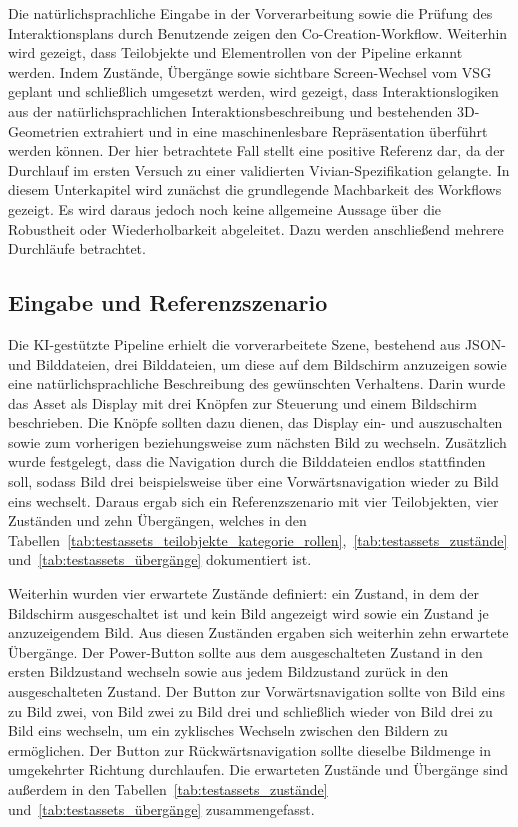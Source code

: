 

Die natürlichsprachliche Eingabe in der Vorverarbeitung sowie die Prüfung des Interaktionsplans durch Benutzende zeigen den Co-Creation-Workflow. Weiterhin wird gezeigt, dass Teilobjekte und Elementrollen von der Pipeline erkannt werden. Indem Zustände, Übergänge sowie sichtbare Screen-Wechsel vom VSG geplant und schließlich umgesetzt werden, wird gezeigt, dass Interaktionslogiken aus der natürlichsprachlichen Interaktionsbeschreibung und bestehenden 3D-Geometrien extrahiert und in eine maschinenlesbare Repräsentation überführt werden können. Der hier betrachtete Fall stellt eine positive Referenz dar, da der Durchlauf im ersten Versuch zu einer validierten Vivian-Spezifikation gelangte. In diesem Unterkapitel wird zunächst die grundlegende Machbarkeit des Workflows gezeigt. Es wird daraus jedoch noch keine allgemeine Aussage über die Robustheit oder Wiederholbarkeit abgeleitet. Dazu werden anschließend mehrere Durchläufe betrachtet.

\subsection{Eingabe und Referenzszenario}

Die KI-gestützte Pipeline erhielt die vorverarbeitete Szene, bestehend aus JSON- und Bilddateien, drei Bilddateien, um diese auf dem Bildschirm anzuzeigen sowie eine natürlichsprachliche Beschreibung des gewünschten Verhaltens. Darin wurde das Asset als Display mit drei Knöpfen zur Steuerung und einem Bildschirm beschrieben. Die Knöpfe sollten dazu dienen, das Display ein- und auszuschalten sowie zum vorherigen beziehungsweise zum nächsten Bild zu wechseln. Zusätzlich wurde festgelegt, dass die Navigation durch die Bilddateien endlos stattfinden soll, sodass Bild drei beispielsweise über eine Vorwärtsnavigation wieder zu Bild eins wechselt. Daraus ergab sich ein Referenzszenario mit vier Teilobjekten, vier Zuständen und zehn Übergängen, welches in den Tabellen~\ref{tab:testassets_teilobjekte_kategorie_rollen},~\ref{tab:testassets_zustände} und~\ref{tab:testassets_übergänge} dokumentiert ist.

Weiterhin wurden vier erwartete Zustände definiert: ein Zustand, in dem der Bildschirm ausgeschaltet ist und kein Bild angezeigt wird sowie ein Zustand je anzuzeigendem Bild. Aus diesen Zuständen ergaben sich weiterhin zehn erwartete Übergänge. Der Power-Button sollte aus dem ausgeschalteten Zustand in den ersten Bildzustand wechseln sowie aus jedem Bildzustand zurück in den ausgeschalteten Zustand. Der Button zur Vorwärtsnavigation sollte von Bild eins zu Bild zwei, von Bild zwei zu Bild drei und schließlich wieder von Bild drei zu Bild eins wechseln, um ein zyklisches Wechseln zwischen den Bildern zu ermöglichen. Der Button zur Rückwärtsnavigation sollte dieselbe Bildmenge in umgekehrter Richtung durchlaufen. Die erwarteten Zustände und Übergänge sind außerdem in den Tabellen~\ref{tab:testassets_zustände} und~\ref{tab:testassets_übergänge} zusammengefasst.

